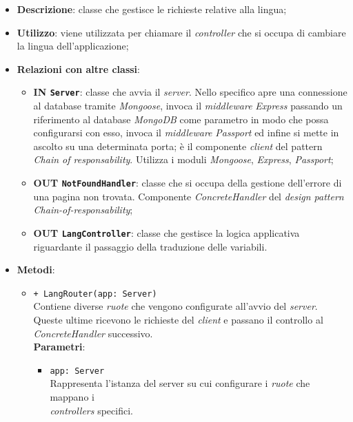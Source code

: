 	\begin{itemize}
		\item \textbf{Descrizione}: classe che gestisce le richieste relative alla lingua;
		\item \textbf{Utilizzo}: viene utilizzata per chiamare il \textit{controller} che si occupa di cambiare la lingua dell'applicazione;
		\item \textbf{Relazioni con altre classi}:
			\begin{itemize}
				\item \textbf{IN \texttt{Server}}: classe che avvia il \textit{server}. Nello specifico apre una connessione al database tramite \textit{Mongoose}, invoca il \textit{middleware} \textit{Express} passando un riferimento al database \textit{MongoDB} come parametro in modo che possa configurarsi con esso, invoca il \textit{middleware} \textit{Passport} ed infine si mette in ascolto su una determinata porta; è il componente \textit{client} del pattern \textit{Chain of responsability}. Utilizza i moduli \textit{Mongoose}, \textit{Express}, \textit{Passport};
				\item \textbf{OUT \texttt{NotFoundHandler}}: classe che si occupa della gestione dell'errore di una pagina non trovata. Componente \textit{ConcreteHandler} del \textit{design pattern} \textit{Chain-of-responsability};
				\item \textbf{OUT \texttt{LangController}}: classe che gestisce la logica applicativa riguardante il passaggio della traduzione delle variabili.
			\end{itemize}
		\item \textbf{Metodi}:
			\begin{itemize}
				\item \texttt{+ LangRouter(app: Server)} \\
				Contiene diverse \textit{ruote} che vengono configurate all'avvio del \textit{server}. Queste ultime ricevono le richieste del \textit{client} e passano il controllo al \textit{ConcreteHandler} successivo. \\
				\textbf{Parametri}:
					\begin{itemize}
						\item \texttt{app: Server} \\
						Rappresenta l'istanza del server su cui configurare i \textit{ruote} che mappano i\\ \textit{controllers} specifici.
					\end{itemize}
			\end{itemize}
	\end{itemize}